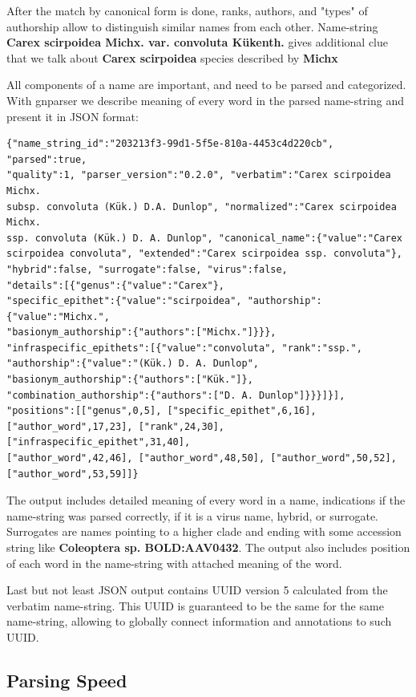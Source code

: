 \documentclass{bmcart}
\begin{document}
After the match by canonical form is done, ranks, authors, and "types" of
authorship allow to distinguish similar names from each other.
Name-string \textbf{Carex scirpoidea Michx. var. convoluta Kükenth.} gives
additional clue that we talk about \textbf{Carex scirpoidea} species described
by \textbf{Michx}

All components of a name are important, and need to be parsed and categorized.
With gnparser we describe meaning of every word in the parsed name-string
and present it in JSON format:


\vspace{0.5cm}
\begin{Verbatim}[fontsize=\small]
{"name_string_id":"203213f3-99d1-5f5e-810a-4453c4d220cb", "parsed":true,
"quality":1, "parser_version":"0.2.0", "verbatim":"Carex scirpoidea Michx.
subsp. convoluta (Kük.) D.A. Dunlop", "normalized":"Carex scirpoidea Michx.
ssp. convoluta (Kük.) D. A. Dunlop", "canonical_name":{"value":"Carex
scirpoidea convoluta", "extended":"Carex scirpoidea ssp. convoluta"},
"hybrid":false, "surrogate":false, "virus":false,
"details":[{"genus":{"value":"Carex"},
"specific_epithet":{"value":"scirpoidea", "authorship":{"value":"Michx.",
"basionym_authorship":{"authors":["Michx."]}}},
"infraspecific_epithets":[{"value":"convoluta", "rank":"ssp.",
"authorship":{"value":"(Kük.) D. A. Dunlop",
"basionym_authorship":{"authors":["Kük."]},
"combination_authorship":{"authors":["D. A. Dunlop"]}}}]}],
"positions":[["genus",0,5], ["specific_epithet",6,16],
["author_word",17,23], ["rank",24,30], ["infraspecific_epithet",31,40],
["author_word",42,46], ["author_word",48,50], ["author_word",50,52],
["author_word",53,59]]}
\end{Verbatim}
\vspace{0.5cm}

The output includes detailed meaning of every word in a name, indications if
the name-string was parsed correctly, if it is a virus name, hybrid, or
surrogate. Surrogates are names pointing to a higher clade and ending with
some accession string like \textbf{Coleoptera sp. BOLD:AAV0432}. The output
also includes position of each word in the name-string with attached meaning
of the word.

Last but not least JSON output contains UUID version 5 calculated from the
verbatim name-string. This UUID is guaranteed to be the same for the same
name-string, allowing to globally connect information and annotations to such
UUID.

\subsection*{Parsing Speed}
\end{document}
